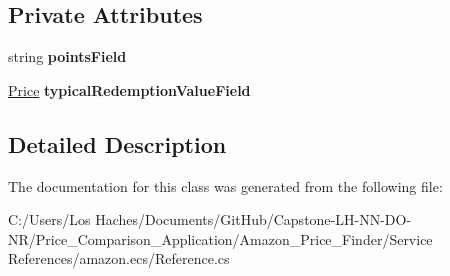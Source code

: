 \subsection*{Private Attributes}
\begin{DoxyCompactItemize}
\item 
\hypertarget{class_price___comparison_1_1amazon_1_1ecs_1_1_loyalty_points_a6681cd040a769430f303c813f193c106}{string {\bfseries points\-Field}}\label{class_price___comparison_1_1amazon_1_1ecs_1_1_loyalty_points_a6681cd040a769430f303c813f193c106}

\item 
\hypertarget{class_price___comparison_1_1amazon_1_1ecs_1_1_loyalty_points_a2c3d51a136e577823fcaeb7a0e2accc0}{\hyperlink{class_price___comparison_1_1amazon_1_1ecs_1_1_price}{Price} {\bfseries typical\-Redemption\-Value\-Field}}\label{class_price___comparison_1_1amazon_1_1ecs_1_1_loyalty_points_a2c3d51a136e577823fcaeb7a0e2accc0}

\end{DoxyCompactItemize}


\subsection{Detailed Description}


The documentation for this class was generated from the following file\-:\begin{DoxyCompactItemize}
\item 
C\-:/\-Users/\-Los Haches/\-Documents/\-Git\-Hub/\-Capstone-\/\-L\-H-\/\-N\-N-\/\-D\-O-\/\-N\-R/\-Price\-\_\-\-Comparison\-\_\-\-Application/\-Amazon\-\_\-\-Price\-\_\-\-Finder/\-Service References/amazon.\-ecs/Reference.\-cs\end{DoxyCompactItemize}
